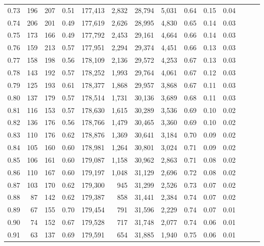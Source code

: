 \begin{tabular}{rrrrrrrrrrrrrr}
0.73 &    196 &  207 &  0.51 &  177,413 &    2,832 &  28,794 &   5,031 &  0.64 &  0.15 &      0.04 \\
0.74 &    206 &  201 &  0.49 &  177,619 &    2,626 &  28,995 &   4,830 &  0.65 &  0.14 &      0.03 \\
0.75 &    173 &  166 &  0.49 &  177,792 &    2,453 &  29,161 &   4,664 &  0.66 &  0.14 &      0.03 \\
0.76 &    159 &  213 &  0.57 &  177,951 &    2,294 &  29,374 &   4,451 &  0.66 &  0.13 &      0.03 \\
0.77 &    158 &  198 &  0.56 &  178,109 &    2,136 &  29,572 &   4,253 &  0.67 &  0.13 &      0.03 \\
0.78 &    143 &  192 &  0.57 &  178,252 &    1,993 &  29,764 &   4,061 &  0.67 &  0.12 &      0.03 \\
0.79 &    125 &  193 &  0.61 &  178,377 &    1,868 &  29,957 &   3,868 &  0.67 &  0.11 &      0.03 \\
0.80 &    137 &  179 &  0.57 &  178,514 &    1,731 &  30,136 &   3,689 &  0.68 &  0.11 &      0.03 \\
0.81 &    116 &  153 &  0.57 &  178,630 &    1,615 &  30,289 &   3,536 &  0.69 &  0.10 &      0.02 \\
0.82 &    136 &  176 &  0.56 &  178,766 &    1,479 &  30,465 &   3,360 &  0.69 &  0.10 &      0.02 \\
0.83 &    110 &  176 &  0.62 &  178,876 &    1,369 &  30,641 &   3,184 &  0.70 &  0.09 &      0.02 \\
0.84 &    105 &  160 &  0.60 &  178,981 &    1,264 &  30,801 &   3,024 &  0.71 &  0.09 &      0.02 \\
0.85 &    106 &  161 &  0.60 &  179,087 &    1,158 &  30,962 &   2,863 &  0.71 &  0.08 &      0.02 \\
0.86 &    110 &  167 &  0.60 &  179,197 &    1,048 &  31,129 &   2,696 &  0.72 &  0.08 &      0.02 \\
0.87 &    103 &  170 &  0.62 &  179,300 &      945 &  31,299 &   2,526 &  0.73 &  0.07 &      0.02 \\
0.88 &     87 &  142 &  0.62 &  179,387 &      858 &  31,441 &   2,384 &  0.74 &  0.07 &      0.02 \\
0.89 &     67 &  155 &  0.70 &  179,454 &      791 &  31,596 &   2,229 &  0.74 &  0.07 &      0.01 \\
0.90 &     74 &  152 &  0.67 &  179,528 &      717 &  31,748 &   2,077 &  0.74 &  0.06 &      0.01 \\
0.91 &     63 &  137 &  0.69 &  179,591 &      654 &  31,885 &   1,940 &  0.75 &  0.06 &      0.01 \\

\end{tabular}

